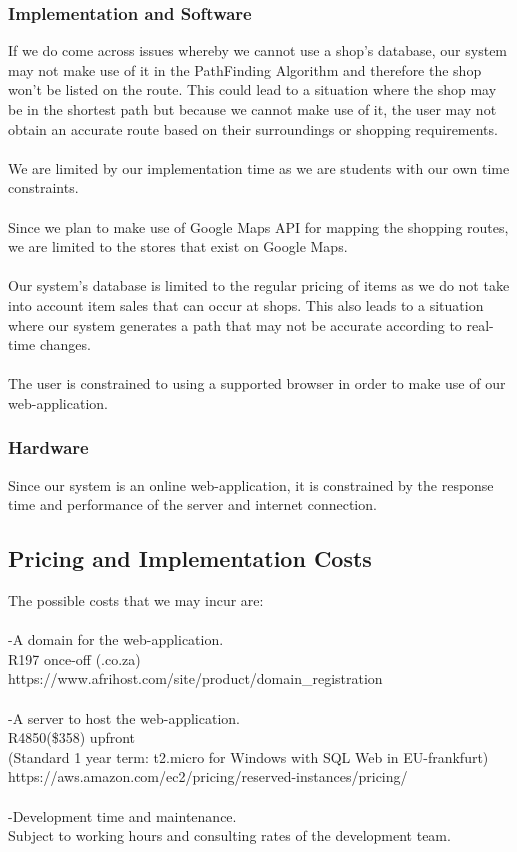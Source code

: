 \documentclass[12pt]{article}
\begin{document}
\subsubsection{Implementation and Software}
If we do come across issues whereby we cannot use a shop's database, our system may not make use of it in the PathFinding Algorithm and therefore the shop won't be listed on the route. This could lead to a situation where the shop may be in the shortest path but because we cannot make use of it, the user may not obtain an accurate route based on their surroundings or shopping requirements.\\\\
We are limited by our implementation time as we are students with our own time constraints.\\\\
Since we plan to make use of Google Maps API for mapping the shopping routes, we are limited to the stores that exist on Google Maps.\\\\
Our system's database is limited to the regular pricing of items as we do not take into account item sales that can occur at shops. This also leads to a situation where our system generates a path that may not be accurate according to real-time changes.\\\\
The user is constrained to using a supported browser in order to make use of our web-application.
\subsubsection{Hardware}
Since our system is an online web-application, it is constrained by the response time and performance of the server and internet connection.

\subsection{Pricing and Implementation Costs}
The possible costs that we may incur are:\\\\
-A domain for the web-application.\\
 R197 once-off   (.co.za)\\
 https://www.afrihost.com/site/product/domain{\_}registration\\\\
-A server to host the web-application.\\
R4850(\$358) upfront \\
(Standard 1 year term: t2.micro for Windows with SQL Web in EU-frankfurt)\\
https://aws.amazon.com/ec2/pricing/reserved-instances/pricing/\\\\
-Development time and maintenance.\\
Subject to working hours and consulting rates of the development team.
\end{document}
